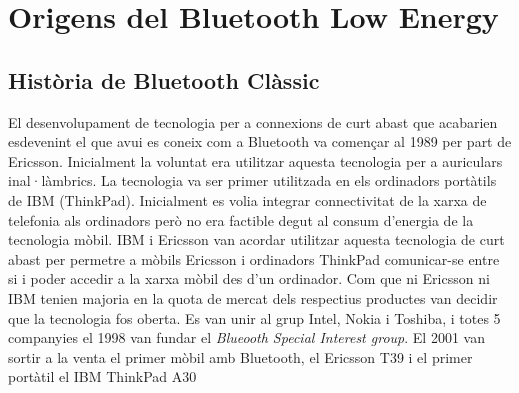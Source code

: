 \chapter{Origens del Bluetooth Low Energy}\label{C:compaginacio}



\section{Història de Bluetooth Clàssic}
El desenvolupament de tecnologia per a connexions de curt abast que acabarien esdevenint el que avui es coneix com a Bluetooth va començar al 1989 per part de Ericsson.
Inicialment la voluntat era utilitzar aquesta tecnologia per a auriculars inal·làmbrics. La tecnologia va ser primer utilitzada en els ordinadors portàtils de IBM (ThinkPad). Inicialment es volia integrar connectivitat de la xarxa de telefonia als ordinadors però no era factible degut al consum d'energia de la tecnologia mòbil.
IBM i Ericsson van acordar utilitzar aquesta tecnologia de curt abast per permetre a mòbils Ericsson i ordinadors ThinkPad comunicar-se entre si i poder accedir a la xarxa mòbil des d'un ordinador.
Com que ni Ericsson ni IBM tenien majoria en la quota de mercat dels respectius productes van decidir que la tecnologia fos oberta. Es van unir al grup Intel, Nokia i Toshiba, i totes 5 companyies el 1998 van fundar el \textit{Blueooth Special Interest group}.
El 2001 van sortir a la venta el primer mòbil amb Bluetooth, el Ericsson T39 i el primer portàtil el IBM ThinkPad A30

